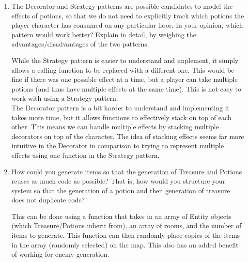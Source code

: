 \documentclass[12pt]{article}
\begin{document}
\begin{enumerate}
\item The Decorator and Strategy patterns are possible candidates to model the effects of potions, so that we do not need to explicitly track which potions the player character has consumed on any particular floor. In your opinion, which pattern would work better? Explain in detail, by weighing the advantages/disadvantages of the two patterns.


While the Strategy pattern is easier to understand and implement, it simply allows a calling function to be replaced with a different one. This would be fine if there was one possible effect at a time, but a player can take multiple potions (and thus have multiple effects at the same time). This is not easy to work with using a Strategy pattern.\\
The Decorator pattern is a bit harder to understand and implementing it takes more time, but it allows functions to effectively stack on top of each other. This means we can handle multiple effects by stacking multiple decorators on top of the character. The idea of stacking effects seems far more intuitive in the Decorator in comparison to trying to represent multiple effects using one function in the Strategy pattern.


\item How could you generate items so that the generation of Treasure and Potions reuses as much code as possible? That is, how would you structure your system so that the generation of a potion and then generation of treasure does not duplicate code?

This can be done using a function that takes in an array of Entity objects (which Treasure/Potions inherit from), an array of rooms, and the number of items to generate. This function can then randomly place copies of the items in the array (randomly selected) on the map. This also has an added benefit of working for enemy generation. 
\end{enumerate}
\end{document}
